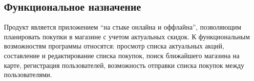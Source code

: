\subsection{Функциональное назначение}
Продукт является приложением ``на стыке онлайна и оффлайна'', позволяющим планировать
покупки в магазине с учетом актуальных скидок. 
К функциональным возможностям программы относятся:
просмотр списка актуальных акций,
составление и редактирование списка покупок, 
поиск ближайшего магазина на карте,
регистрация пользователей,
возможность отправки списка покупок между пользователями.